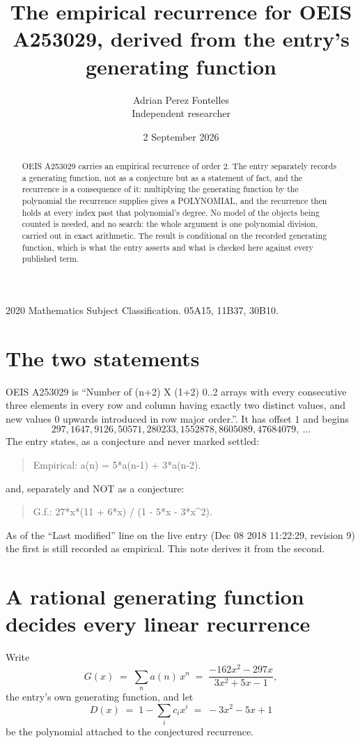 \documentclass[11pt,a4paper]{article}
\title{The empirical recurrence for OEIS A253029, derived from the entry's generating function}
\author{Adrian Perez Fontelles\\ \small Independent researcher}
\date{2 September 2026}
\theoremstyle{plain}
\theoremstyle{definition}
\begin{document}
\maketitle

\begin{abstract}
OEIS A253029 carries an empirical recurrence of order $2$. The entry separately records a
generating function, not as a conjecture but as a statement of fact, and the recurrence is a
consequence of it: multiplying the generating function by the polynomial the recurrence
supplies gives a POLYNOMIAL, and the recurrence then holds at every index past that
polynomial's degree. No model of the objects being counted is needed, and no search: the
whole argument is one polynomial division, carried out in exact arithmetic. The result is
conditional on the recorded generating function, which is what the entry asserts and what is
checked here against every published term.
\end{abstract}

\noindent\small 2020 Mathematics Subject Classification. 05A15, 11B37, 30B10.\normalsize

\section{The two statements}

OEIS A253029 is ``Number of (n+2) X (1+2) 0..2 arrays with every consecutive three elements in every row and column having exactly two distinct values, and new values 0 upwards introduced in row major order.''. It has offset $1$ and begins
\[
297, 1647, 9126, 50571, 280233, 1552878, 8605089, 47684079,\ \dots
\]
The entry states, as a conjecture and never marked settled:
\begin{quote}
Empirical: a(n) = 5*a(n-1) + 3*a(n-2).
\end{quote}
and, separately and NOT as a conjecture:
\begin{quote}
G.f.: 27*x*(11 + 6*x) / (1 - 5*x - 3*x\^{}2).
\end{quote}
As of the ``Last modified'' line on the live entry (Dec 08 2018 11:22:29, revision 9) the first is still
recorded as empirical. This note derives it from the second.

\section{A rational generating function decides every linear recurrence}

Write
\[
G(x)\;=\;\sum_{n}a(n)\,x^{n}\;=\;\frac{- 162 x^{2} - 297 x}{3 x^{2} + 5 x - 1},
\]
the entry's own generating function, and let
\[
D(x)\;=\;1-\sum_i c_i x^{i}\;=\;- 3 x^{2} - 5 x + 1
\]
be the polynomial attached to the conjectured recurrence.
\end{document}
